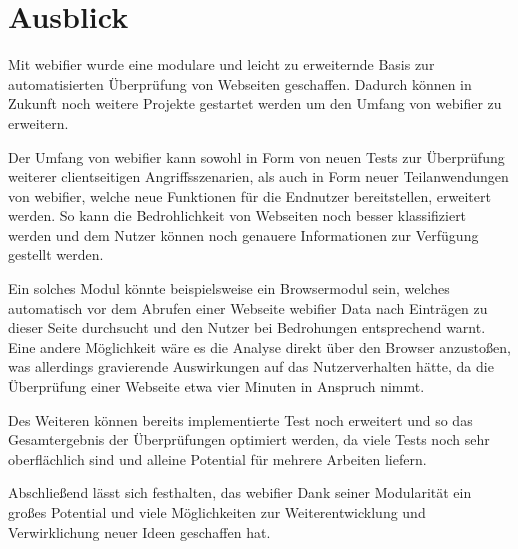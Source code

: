 \chapter{Ausblick}

Mit webifier wurde eine modulare und leicht zu erweiternde Basis zur automatisierten Überprüfung von Webseiten geschaffen. Dadurch können in Zukunft noch weitere Projekte gestartet werden um den Umfang von webifier zu erweitern.

Der Umfang von webifier kann sowohl in Form von neuen Tests zur Überprüfung weiterer clientseitigen Angriffsszenarien, als auch in Form neuer Teilanwendungen von webifier, welche neue Funktionen für die Endnutzer bereitstellen, erweitert werden. So kann die Bedrohlichkeit von Webseiten noch besser klassifiziert werden und dem Nutzer können noch genauere Informationen zur Verfügung gestellt werden.

Ein solches Modul könnte beispielsweise ein Browsermodul sein, welches automatisch vor dem Abrufen einer Webseite webifier Data nach Einträgen zu dieser Seite durchsucht und den Nutzer bei Bedrohungen entsprechend warnt. Eine andere Möglichkeit wäre es die Analyse direkt über den Browser anzustoßen, was allerdings gravierende Auswirkungen auf das Nutzerverhalten hätte, da die Überprüfung einer Webseite etwa vier Minuten in Anspruch nimmt.

Des Weiteren können bereits implementierte Test noch erweitert und so das Gesamtergebnis der Überprüfungen optimiert werden, da viele Tests noch sehr oberflächlich sind und alleine Potential für mehrere Arbeiten liefern.

Abschließend lässt sich festhalten, das webifier Dank seiner Modularität ein großes Potential und viele Möglichkeiten zur Weiterentwicklung und Verwirklichung neuer Ideen geschaffen hat.